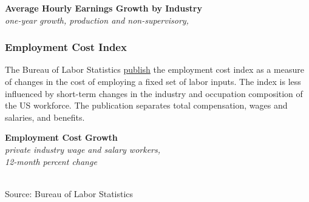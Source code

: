 \documentclass{report}
\makeatletter
\newcommand{\tbllink}[1]{\href{https://raw.githubusercontent.com/bdecon/US-chartbook/master/chartbook/data/#1}{\faTable}}
\newcommand*\short[1]{\expandafter\@gobbletwo\number\numexpr#1\relax}
\newcommand{\stdnode}[3]{\node[below, align=left, shift=({#1,#2})]{#3};}
\newcommand{\dateaxisticks}{
		date coordinates in=x, axis line style={draw=none},
		xmax={2022-01-30},
		max space between ticks=40,	    
		xtick={{1990-01-01}, {1992-01-01}, {1994-01-01}, 
			{1996-01-01}, {1998-01-01}, {2000-01-01}, 
			{2002-01-01}, {2004-01-01}, {2006-01-01},
			{2008-01-01}, {2010-01-01}, {2012-01-01}, {2014-01-01},
		    {2016-01-01}, {2018-01-01}, {2020-01-01}, {2022-01-01}},
		minor xtick={{1989-01-01}, {1991-01-01}, {1993-01-01},
			{1995-01-01}, {1997-01-01}, {1999-01-01}, 
			{2001-01-01}, {2003-01-01}, {2005-01-01}, {2007-01-01},
		    {2009-01-01}, {2011-01-01}, {2013-01-01}, {2015-01-01},
		    {2017-01-01}, {2019-01-01}, {2021-01-01}},
		enlarge y limits={0.06}, enlarge x limits={0.01},
		}
\newcommand{\bbar}[2]{extra #1 ticks = {{#2}}, extra #1 tick labels = ,
		extra #1 tick style = {grid=major, grid style={thick, black!25}},}
\newcommand{\stdline}[4]{\addplot[very thick, no markers, color=#1] 
		table [x=#2, y=#3, col sep=comma] {#4};	}
\newcommand{\rebars}{
		\fill[color=black!10] (axis cs:{2007-12-01},\pgfkeysvalueof{/pgfplots/ymin}) rectangle 
			(axis cs:{2009-07-01}, \pgfkeysvalueof{/pgfplots/ymax});
		\fill[color=black!10] (axis cs:{2001-03-01},\pgfkeysvalueof{/pgfplots/ymin}) rectangle 
			(axis cs:{2001-11-01}, \pgfkeysvalueof{/pgfplots/ymax});
		\fill[color=black!10] (axis cs:{2020-02-01},\pgfkeysvalueof{/pgfplots/ymin}) rectangle 
			(axis cs:{2020-05-01}, \pgfkeysvalueof{/pgfplots/ymax});}
\makeatother
\begin{document}
{{\begin{minipage}{0.76\textwidth}
\small  
\vspace{3mm}

\normalsize \textbf{Average Hourly Earnings Growth by Industry}\\
\footnotesize{\textit{one-year growth, production and non-supervisory, }}\\

\end{minipage}
\newpage
\begin{minipage}{0.76\textwidth}
\subsubsection*{\color{black!70} \seriffont Employment Cost Index}
\small The Bureau of Labor Statistics \href{https://www.bls.gov/news.release/eci.nr0.htm}{publish} the employment cost index as a measure of changes in the cost of employing a fixed set of labor inputs. The index is less influenced by short-term changes in the industry and occupation composition of the US workforce. The publication separates total compensation, wages and salaries, and benefits.
\end{minipage}

\begin{minipage}{0.44\textwidth}
\normalsize \textbf{Employment Cost Growth}\\
\footnotesize{\textit{private industry wage and salary workers,}}\\
\footnotesize{\textit{12-month percent change}}\\
\hspace*{-2mm} \\
\footnotesize{Source: Bureau of Labor Statistics} \hfill \tbllink{eci.csv}
\end{minipage} \hspace{6mm} \begin{minipage}{0.27\textwidth}
\small 
\end{minipage}
\newpage
}}
\end{document}
